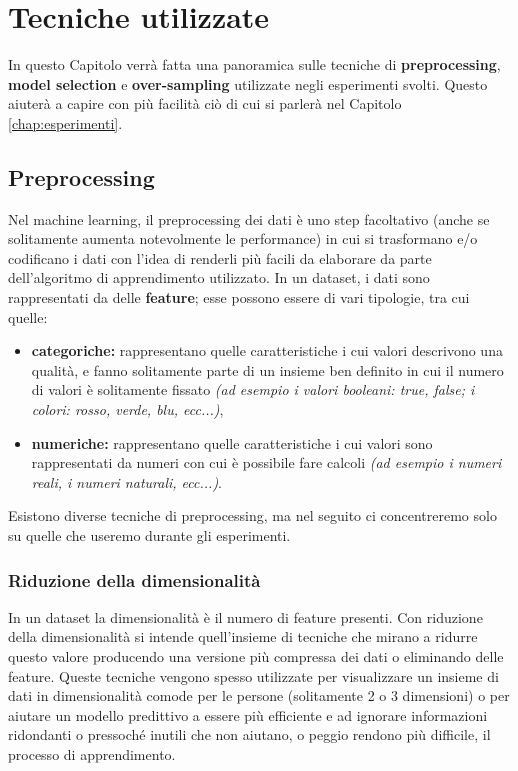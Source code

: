 \documentclass[12pt, twoside, letterpaper]{report}
\begin{document}
				
				
	\chapter{Tecniche utilizzate}
		In questo Capitolo verrà fatta una panoramica sulle tecniche di \textbf{preprocessing}, \textbf{model selection} e \textbf{over-sampling} utilizzate negli esperimenti svolti. Questo aiuterà a capire con più facilità ciò di cui si parlerà nel Capitolo \ref{chap:esperimenti}.
		\section{Preprocessing}
			Nel machine learning, il preprocessing dei dati è uno step facoltativo (anche se solitamente aumenta notevolmente le performance) in cui si trasformano e/o codificano i dati con l'idea di renderli più facili da elaborare da parte dell'algoritmo di apprendimento utilizzato. In un dataset, i dati sono rappresentati da delle \textbf{feature}; esse possono essere di vari tipologie, tra cui quelle: 
			
			\begin{itemize}
				\item \textbf{categoriche:} rappresentano quelle caratteristiche i cui valori descrivono una qualità, e fanno solitamente parte di un insieme ben definito in cui il numero di valori è solitamente fissato \textit{(ad esempio i valori booleani: true, false; i colori: rosso, verde, blu, ecc...)},
				\item \textbf{numeriche:} rappresentano quelle caratteristiche i cui valori sono rappresentati da numeri con cui è possibile fare calcoli \textit{(ad esempio i numeri reali, i numeri naturali, ecc...)}.
			\end{itemize}
			Esistono diverse tecniche di preprocessing, ma nel seguito ci concentreremo solo su quelle che useremo durante gli esperimenti.
			
			\subsection{Riduzione della dimensionalità} In un dataset la dimensionalità è il numero di feature presenti. Con riduzione della dimensionalità si intende quell'insieme di tecniche che mirano a ridurre questo valore producendo una versione più compressa dei dati o eliminando delle feature. Queste tecniche vengono spesso utilizzate per visualizzare un insieme di dati in dimensionalità comode per le persone (solitamente 2 o 3 dimensioni) o per aiutare un modello predittivo a essere più efficiente e ad ignorare informazioni ridondanti o pressoché inutili che non aiutano, o peggio rendono più difficile, il processo di apprendimento. 
			
\end{document}
